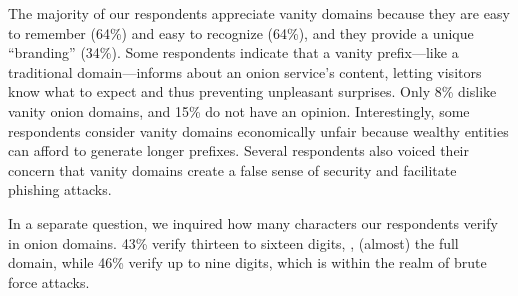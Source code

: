 The majority of our respondents appreciate vanity domains because they are easy
to remember (64\%) and easy to recognize (64\%), and they provide a unique
``branding'' (34\%).  Some respondents indicate that a vanity prefix---like a
traditional domain---informs about an onion service's content, letting visitors
know what to expect and thus preventing unpleasant surprises.  Only 8\% dislike vanity
onion domains, and 15\% do not have an opinion.  Interestingly, some respondents
consider vanity domains economically unfair because wealthy entities can afford
to generate longer prefixes.  Several respondents also voiced their concern that
vanity domains create a false sense of security and facilitate phishing attacks.

In a separate question, we inquired how many characters our respondents verify in
onion domains.  43\% verify thirteen to sixteen digits, \ie, (almost) the full
domain, while 46\% verify up to nine digits, which is within the realm of brute
force attacks.
